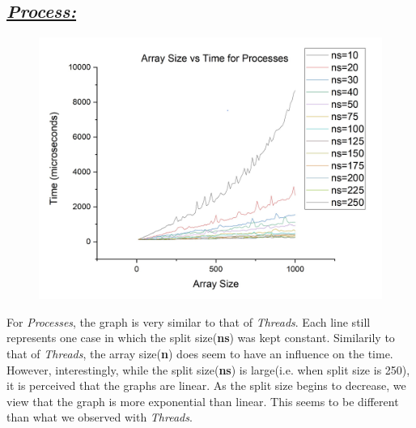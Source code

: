 \documentclass{article}
\begin{document}
            \subsection*{\color{blue}\textit{\underline{Process:}}\color{black}}
                \begin{figure}[H]
                    \centering
                    \includegraphics[width=12cm]{svt-Processes}
                \end{figure}
                For \color{blue}\textit{Processes}\color{black}, the graph is very similar to that of \color{red}\textit{Threads}\color{black}. Each line still represents one case in which the split size(\textbf{ns}) was kept constant.
                Similarily to that of \color{red}\textit{Threads}\color{black}, the array size(\textbf{n}) does seem to have an influence on the time.
                However, interestingly, while the split size(\textbf{ns}) is large(i.e. when split size is 250), it is perceived that the graphs are linear. As the split size begins to decrease, we view that the graph is more exponential than linear. \newline
                This seems to be different than what we observed with \color{red}\textit{Threads}\color{black}.
            \pagebreak
\end{document}
